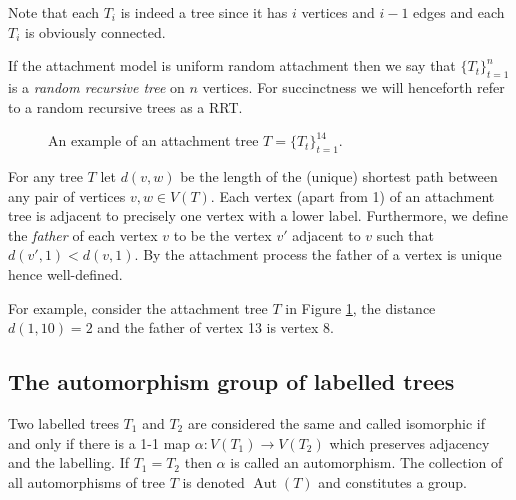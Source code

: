 \documentclass[oneside]{book} %
\theoremstyle{definition}
\numberwithin{equation}{section}
\DeclareMathOperator{\Aut}{Aut} %
\begin{document}
Note that each $T_i$ is indeed a tree since it has $i$ vertices and $i-1$ edges and each $T_i$ is obviously connected. 

If the attachment model is uniform random attachment then we say that $\{T_t\}_{t=1}^{n}$ is a \emph{ 
random recursive tree} on $n$ vertices. For succinctness we will henceforth refer to a random recursive trees as a RRT.  
\begin{figure}[ht]
\centering
{}
\caption{An example of an attachment tree $T = \{T_t\}_{t=1}^{14}$.}\label{fig1}
\end{figure}

For any tree $T$ let  $d(v,w)$ be the length of the (unique) shortest path between any pair of vertices $v,w \in V(T)$. 
Each vertex (apart from 1) of an attachment tree is adjacent to precisely one vertex with a lower label. Furthermore, we 
define the \emph{father} of each vertex $v$ to be the vertex $v'$ adjacent to $v$ such that $d(v',1)< d(v,1)$. By the attachment 
process the father of a vertex is unique hence well-defined.

For example, consider the attachment tree $T$ in Figure \ref{fig1}, the distance $d(1,10) = 2$ and the father of vertex 13 is vertex 8.

\subsection{The automorphism group of labelled trees}\label{sec:yo}
Two labelled trees $T_{1}$ and $T_2$ are considered the same and called isomorphic if and only if there is a 1-1 map $\alpha: V(T_1) \rightarrow V(T_2)$ which preserves adjacency and the labelling.  If $T_1 = T_2$ then $\alpha$ is called an automorphism.  The collection of all automorphisms of tree $T$ is  denoted $\Aut(T)$ and constitutes a group.
\end{document}
